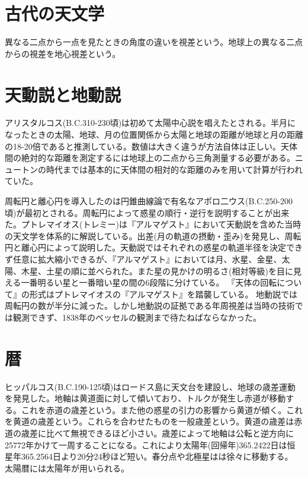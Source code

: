 
\section{古代の天文学}
	異なる二点から一点を見たときの角度の違いを視差という。地球上の異なる二点からの視差を地心視差という。
\section{天動説と地動説}
	アリスタルコス(B.C.310-230頃)は初めて太陽中心説を唱えたとされる。半月になったときの太陽、地球、月の位置関係から太陽と地球の距離が地球と月の距離の18-20倍であると推測している。数値は大きく違うが方法自体は正しい。天体間の絶対的な距離を測定するには地球上の二点から三角測量する必要がある。ニュートンの時代までは基本的に天体間の相対的な距離のみを用いて計算が行われていた。
	
	周転円と離心円を導入したのは円錐曲線論で有名なアポロ二ウス(B.C.250-200頃)が最初とされる。周転円によって惑星の順行・逆行を説明することが出来た。プトレマイオス(トレミー)は『アルマゲスト』において天動説を含めた当時の天文学を体系的に解説している。出差(月の軌道の摂動・歪み)を発見し、周転円と離心円によって説明した。天動説ではそれぞれの惑星の軌道半径を決定できず任意に拡大縮小できるが、『アルマゲスト』においては月、水星、金星、太陽、木星、土星の順に並べられた。また星の見かけの明るさ(相対等級)を目に見える一番明るい星と一番暗い星の間の6段階に分けている。
	『天体の回転について』の形式はプトレマイオスの『アルマゲスト』を踏襲している。
	地動説では周転円の数が半分に減った。しかし地動説の証拠である年周視差は当時の技術では観測できず、1838年のベッセルの観測まで待たねばならなかった。
\section{暦}
	ヒッパルコス(B.C.190-125頃)はロードス島に天文台を建設し、地球の歳差運動を発見した。地軸は黄道面に対して傾いており、トルクが発生し赤道が移動する。これを赤道の歳差という。また他の惑星の引力の影響から黄道が傾く。これを黄道の歳差という。これらを合わせたものを一般歳差という。黄道の歳差は赤道の歳差に比べて無視できるほど小さい。歳差によって地軸は公転と逆方向に25772年かけて一周することになる。これにより太陽年(回帰年)365.2422日は恒星年365.2564日より20分24秒ほど短い。春分点や北極星はは徐々に移動する。
	太陽暦には太陽年が用いられる。
